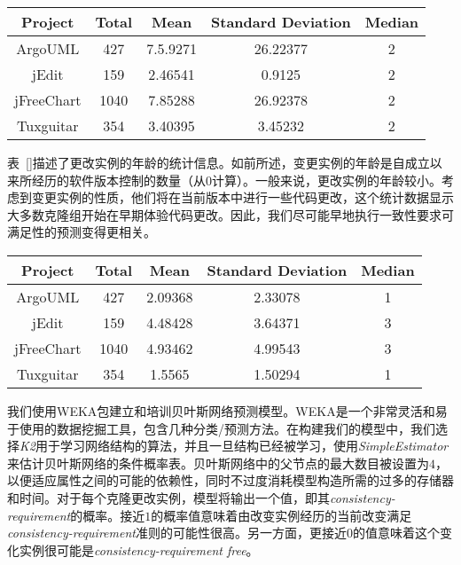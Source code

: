 {\begin{table}[htbp]
\vspace{0.5em}\centering\wuhao
\begin{tabular}{ccccc}
\toprule[1.5pt]
\textbf{Project}&\textbf{Total}&\textbf{Mean}&\textbf{Standard Deviation}&\textbf{Median}\\ \hline
\midrule[1pt]
ArgoUML&427&7.5.9271&	26.22377&2\\ \hline
jEdit&159&	2.46541&	0.9125&2\\ \hline
jFreeChart&1040&	7.85288&	26.92378&2\\ \hline
Tuxguitar&354&	3.40395	&3.45232&2\\ 
\bottomrule[1.5pt]
\end{tabular}
\end{table}

表~\ref{}描述了更改实例的年龄的统计信息。如前所述，变更实例的年龄是自成立以来所经历的软件版本控制的数量（从$ 0 $计算）。一般来说，更改实例的年龄较小。考虑到变更实例的性质，他们将在当前版本中进行一些代码更改，这个统计数据显示大多数克隆组开始在早期体验代码更改。因此，我们尽可能早地执行一致性要求可满足性的预测变得更相关。

\begin{table}[htbp]
\vspace{0.5em}\centering\wuhao
\begin{tabular}{ccccc}
\toprule[1.5pt]
\textbf{Project}&\textbf{Total}&\textbf{Mean}&\textbf{Standard Deviation}&\textbf{Median}\\ \hline
\midrule[1pt]
ArgoUML&427&2.09368&2.33078&1\\ \hline
jEdit&159&4.48428&3.64371&3\\ \hline	
jFreeChart&1040&4.93462&4.99543&3\\ \hline	
Tuxguitar&354&1.5565&1.50294&1\\ \hline	
\bottomrule[1.5pt]
\end{tabular}
\end{table}

我们使用WEKA包建立和培训贝叶斯网络预测模型。WEKA是一个非常灵活和易于使用的数据挖掘工具，包含几种分类/预测方法。在构建我们的模型中，我们选择{\em K2}用于学习网络结构的算法，并且一旦结构已经被学习，使用{\em  SimpleEstimator}来估计贝叶斯网络的条件概率表。贝叶斯网络中的父节点的最大数目被设置为$ 4 $，以便适应属性之间的可能的依赖性，同时不过度消耗模型构造所需的过多的存储器和时间。对于每个克隆更改实例，模型将输出一个值，即其{\em consistency-requirement}的概率。接近$ 1 $的概率值意味着由改变实例经历的当前改变满足{\em consistency-requirement}准则的可能性很高。另一方面，更接近$ 0 $的值意味着这个变化实例很可能是{\em consistency-requirement free}。

}
